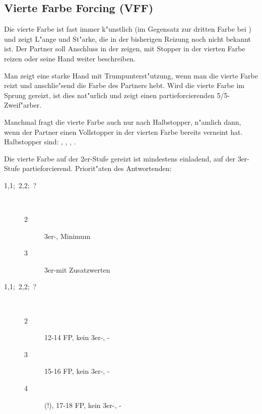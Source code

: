 
\subsection{Vierte Farbe Forcing (VFF)} \label{vff}

Die vierte Farbe ist fast immer k"unstlich (im Gegensatz zur dritten Farbe bei
) und zeigt L"ange und St"arke, die in der bisherigen Reizung noch
nicht bekannt ist. Der Partner soll Anschluss in der \ofa zeigen, \sa mit
Stopper in der vierten Farbe reizen oder seine Hand weiter beschreiben.

Man zeigt eine starke Hand mit Trumpunterst"utzung, wenn man die vierte
Farbe reizt und anschlie"send die Farbe des Partners hebt. Wird die vierte
Farbe im Sprung gereizt, ist dies nat"urlich und zeigt einen partieforcierenden
5/5-Zweif"arber.

Manchmal fragt die vierte Farbe auch nur nach Halbstopper, n"amlich dann, wenn
der Partner einen Vollstopper in der vierten Farbe bereits verneint hat.
Halbstopper sind: , , , .

Die vierte Farbe auf der 2er-Stufe gereizt ist mindestens einladend, auf der
3er-Stufe partieforcierend.
Priorit"aten des Antwortenden:

\begin{description}
\item[1\coe{}\sep1\pik;~2\tre{}\sep2\kar;~?]~
  \begin{description}
    \item[2\pik] 3er-\pi, Minimum
    \item[3\pik] 3er-\pi mit Zusatzwerten
  \end{description}
\end{description}

\begin{description}
\item[1\coe{}\sep1\pik;~2\tre{}\sep2\kar;~?]~
  \begin{description}
    \item[2\SA] 12-14 FP, kein 3er-\pi, \ka-\stp
    \item[3\SA] 15-16 FP, kein 3er-\pi, \ka-\stp
    \item[4\SA] \nat{} (!), 17-18 FP, kein 3er-\pi, \ka-\stp
  \end{description}
\end{description}

